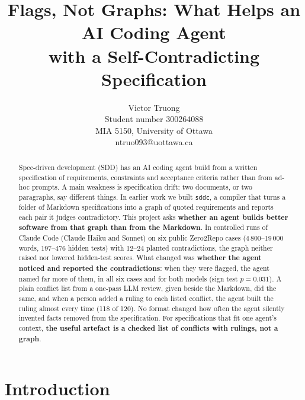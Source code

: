 \documentclass{article}
\title{Flags, Not Graphs: What Helps an AI Coding Agent\\with a Self-Contradicting Specification}
\author{%
  Victor Truong \\
  Student number 300264088 \\
  MIA 5150, University of Ottawa \\
  ntruo093@uottawa.ca \\
}
\newcommand{\code}[1]{\texttt{#1}}
\begin{document}
\maketitle

\begin{abstract}
Spec-driven development (SDD) has an AI coding agent build from a written specification of requirements,
constraints and acceptance criteria rather than from ad-hoc prompts. A main weakness is specification
drift: two documents, or two paragraphs, say different things. In earlier work we built \code{sddc}, a
compiler that turns a folder of Markdown specifications into a graph of quoted requirements and reports
each pair it judges contradictory. This project asks \textbf{whether an agent builds better software from
that graph than from the Markdown}. In controlled runs of Claude Code (Claude Haiku and Sonnet) on six
public Zero2Repo cases (4\,800--19\,000 words, 197--476 hidden tests) with 12--24 planted contradictions,
the graph neither raised nor lowered hidden-test scores. What changed was \textbf{whether the agent noticed
and reported the contradictions}: when they were flagged, the agent named far more of them, in all six
cases and for both models (sign test $p = 0.031$). A plain conflict list from a one-pass LLM review,
given beside the Markdown, did the same, and when a person added a ruling to each listed conflict, the
agent built the ruling almost every time (118 of 120). No format changed how often the agent silently
invented facts removed from the specification. For specifications that fit one agent's context,
\textbf{the useful artefact is a checked list of conflicts with rulings, not a graph}.
\end{abstract}

\section{Introduction}
\end{document}
